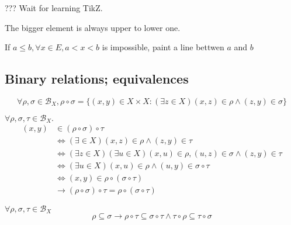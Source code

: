 \begin{Sym}    ??? Wait for learning TikZ.
    
    The bigger element is always upper to lower one.

    If $a\leq b, \forall x\in E, a<x<b$ is impossible, paint a line bettwen $a$ and $b$
\end{Sym}

\subsection[4]{Binary relations; equivalences}


\begin{Def}
    \[
        \forall \rho, \sigma \in \mathcal{B}_X, \rho \circ \sigma =\{(x,y)\in X\times X: (\exists z\in X)(x,z)\in \rho \wedge (z,y)\in \sigma\}
    \]
\end{Def}

\begin{Prop}
    $\forall \rho, \sigma, \tau \in \mathcal{B}_X.$
    \begin{align*}
        (x,y) &\in (\rho \circ \sigma) \circ \tau   \\
        &\Leftrightarrow (\exists \in X)(x,z)\in \rho \wedge (z,y)\in \tau  \\
        &\Leftrightarrow (\exists z\in X)(\exists u \in X)(x,u)\in \rho,(u,z)\in \sigma \wedge (z,y) \in \tau   \\
        &\Leftrightarrow (\exists u \in X)(x,u)\in \rho \wedge (u,y)\in \sigma \circ \tau   \\
        &\Leftrightarrow (x,y)\in \rho \circ (\sigma \circ \tau)    \\
        &\rightarrow (\rho \circ \sigma) \circ \tau = \rho \circ (\sigma \circ \tau)
    \end{align*}
\end{Prop}

\begin{Rmk}
    $\forall \rho, \sigma, \tau \in \mathcal{B}_X$
    \[\rho \subseteq \sigma \rightarrow \rho \circ \tau \subseteq \sigma \circ \tau \wedge \tau \circ \rho \subseteq \tau \circ \sigma\]
\end{Rmk}


